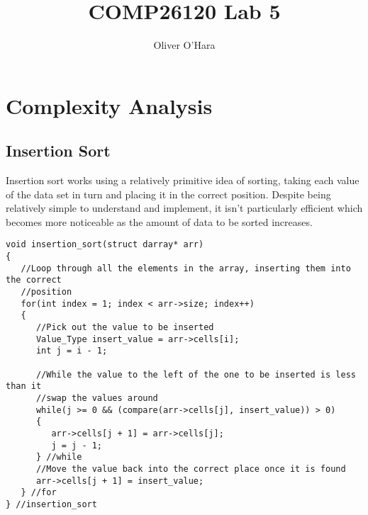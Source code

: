 \documentclass{article}
\title{COMP26120 Lab 5}
\author{Oliver O'Hara}
\begin{document}
\maketitle


\section{Complexity Analysis}
\label{sec:complexity}


\subsection{Insertion Sort}
Insertion sort works using a relatively primitive idea of sorting, taking each value of the data set in turn and placing it in the correct position. Despite being relatively simple to understand and implement, it isn't particularly efficient which becomes more noticeable as the amount of data to be sorted increases.

\begin{verbatim}
void insertion_sort(struct darray* arr)
{
   //Loop through all the elements in the array, inserting them into the correct
   //position
   for(int index = 1; index < arr->size; index++)
   {
      //Pick out the value to be inserted
      Value_Type insert_value = arr->cells[i];
      int j = i - 1;

      //While the value to the left of the one to be inserted is less than it
      //swap the values around
      while(j >= 0 && (compare(arr->cells[j], insert_value)) > 0)
      {
         arr->cells[j + 1] = arr->cells[j];
         j = j - 1;
      } //while
      //Move the value back into the correct place once it is found
      arr->cells[j + 1] = insert_value;
   } //for
} //insertion_sort
\end{verbatim}
\end{document}
